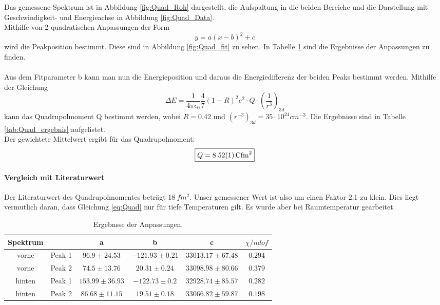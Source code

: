 \documentclass[12pt,a4paper]{article}
\begin{document}
Das gemessene Spektrum ist in Abbildung \ref{fig:Quad_Roh} dargestellt, die Aufspaltung in die beiden Bereiche und die Darstellung mit Geschwindigkeit- und Energieachse in Abbildung \ref{fig:Quad_Data}.\\
Mithilfe von 2 quadratischen Anpassungen der Form
\begin{equation*}
y = a(x-b)^2+c
\end{equation*}
wird die Peakposition bestimmt. Diese sind in Abbildung \ref{fig:Quad_fit} zu sehen. In Tabelle \ref{tab:Quad_vor} sind die Ergebnisse der Anpassungen zu finden.\\
\\
Aus dem Fitparameter b kann man nun die Energieposition und daraus die Energiedifferenz der beiden Peaks bestimmt werden. Mithilfe der Gleichung
\begin{equation}
\Delta E = \dfrac{1}{4 \pi \epsilon_0}\dfrac{4}{7}(1-R)^2e^2\cdot Q \cdot \left(\dfrac{1}{r^3}\right)_{3d}
\label{eq:Quad}
\end{equation}
kann das Quadrupolmoment Q bestimmt werden, wobei $R = 0.42$ und $(r^{-3})_{3d} = 35\cdot 10^{24} cm^{-3}$. Die Ergebnisse sind in Tabelle \ref{tab:Quad_ergebnis} aufgelistet.\\
Der gewichtete Mittelwert ergibt für das Quadrupolmoment:
\begin{equation*}
\boxed{Q = \SI{8.52\pm 0.01}{C fm^2}}
\end{equation*}

\paragraph{Vergleich mit Literaturwert}
Der Literaturwert des Quadrupolmomentes beträgt $\SI{18}{fm^2}$. Unser gemessener Wert ist also um einen Faktor 2.1 zu klein. Dies liegt vermutlich daran, dass Gleichung \ref{eq:Quad} nur für tiefe Temperaturen gilt. Es wurde aber bei Raumtemperatur gearbeitet.


\begin{table}
\centering
\begin{tabular}{|c|c|c|c|c|c|}
\hline
Spektrum &  & a & b & c & $\chi / ndof$\\
\hline
vorne & Peak 1 & $ 96.9 \pm 24.53 $ & $ -121.93 \pm 0.21 $ & $ 33013.17 \pm 67.48 $ & $ 0.294 $\\
\hline
vorne & Peak 2& $ 74.5 \pm 13.76 $ & $ 20.31 \pm 0.24 $ & $ 33098.98 \pm 80.66 $ & $ 0.379 $\\
\hline
\hline
hinten & Peak 1& $ 153.99 \pm 36.93 $ & $ -122.73 \pm 0.2 $ & $ 32928.74 \pm 85.57 $ & $ 0.282 $\\
\hline
hinten & Peak 2& $ 86.68 \pm 11.15 $ & $ 19.51 \pm 0.18 $ & $ 33066.82 \pm 59.87 $ & $ 0.198 $\\
\hline
\end{tabular}
\caption{Ergebnsse der Anpassungen.}
\label{tab:Quad_vor}
\end{table}
\end{document}
